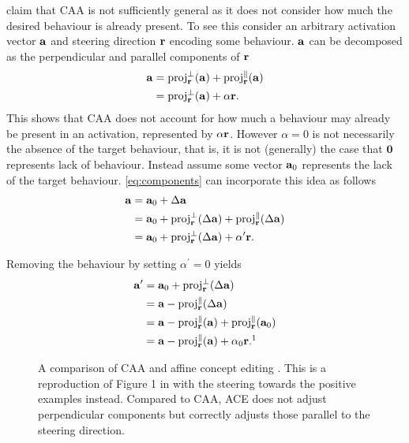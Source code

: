 \citet{ace} claim that CAA \citep{caa} is not sufficiently general as it does not consider how much the desired behaviour is already present.
To see this consider an arbitrary activation vector $\mathbf{a}$ and steering direction $\mathbf{r}$ encoding some behaviour.
$\mathbf{a}$ can be decomposed as the perpendicular and parallel components of $\mathbf{r}$
\begin{equation}
    \label{eq:components}
    \begin{aligned}
        \mathbf{a} &= \text{proj}_{\mathbf{r}}^{\perp}(\mathbf{a}) + \text{proj}_{\mathbf{r}}^{\parallel}(\mathbf{a}) \\
            &= \text{proj}_{\mathbf{r}}^{\perp}(\mathbf{a}) + \alpha\mathbf{r}.
    \end{aligned}
\end{equation}
This shows that CAA \citep{caa} does not account for how much a behaviour may already be present in an activation, represented by $\alpha\mathbf{r}$.
However $\alpha = 0$ is not necessarily the absence of the target behaviour, that is, it is not (generally) the case that $\mathbf{0}$ represents lack of behaviour.
Instead assume some vector $\mathbf{a}_0$ represents the lack of the target behaviour.
\cref{eq:components} can incorporate this idea as follows
\begin{align*}
    \mathbf{a} &= \mathbf{a}_0 + \Delta\mathbf{a} \\
        &= \mathbf{a}_0 + \text{proj}_{\mathbf{r}}^{\perp}(\Delta\mathbf{a}) + \text{proj}_{\mathbf{r}}^{\parallel}(\Delta\mathbf{a}) \\
        &= \mathbf{a}_0 + \text{proj}_{\mathbf{r}}^{\perp}(\Delta\mathbf{a}) + \alpha^\prime\mathbf{r}.
\end{align*}

Removing the behaviour by setting $\alpha^\prime = 0$ yields
\begin{align*}
    \va^\prime &= \va_0 + \text{proj}_\vr^{\perp}(\Delta\va) \\
               &= \va - \text{proj}_\vr^{\parallel}(\Delta\va) \\
               &= \va - \text{proj}_\vr^{\parallel}(\va) + \text{proj}_\vr^{\parallel}(\va_0) \\
               &= \va - \text{proj}_\vr^{\parallel}(\va) + \alpha_0\vr.\footnotemark[1]
\end{align*}

\begin{figure}
    \centering
    \captionsetup{width=.9\textwidth}
    
    \caption{A comparison of CAA \citep{caa} and affine concept editing \citep{ace}. This is a reproduction of Figure 1 in \citet{ace} with the steering towards the positive examples instead. Compared to CAA, ACE does not adjust perpendicular components but correctly adjusts those parallel to the steering direction.}
    \label{fig:ace}
\end{figure}

